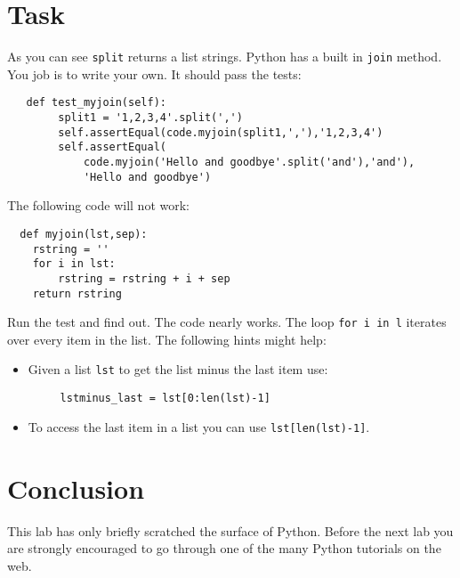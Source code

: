 \documentclass{paper}
\begin{document}
\section{Task}
As you can see {\tt split} returns a list strings. Python has a built
in {\tt join} method. You job is to write your own. It should pass the
tests:
\begin{lstlisting}
   def test_myjoin(self):
        split1 = '1,2,3,4'.split(',')
        self.assertEqual(code.myjoin(split1,','),'1,2,3,4')
        self.assertEqual(
            code.myjoin('Hello and goodbye'.split('and'),'and'),
            'Hello and goodbye')
\end{lstlisting}

The following code will not work:
\begin{lstlisting}
  def myjoin(lst,sep):
    rstring = '' 
    for i in lst:
        rstring = rstring + i + sep
    return rstring
\end{lstlisting}
Run the test and find out. The code nearly works. The loop {\tt for i
  in l} iterates over every item in the list. The following hints might help:
\begin{itemize}
\item Given a list {\tt lst} to get the list minus the last item use:
  \begin{lstlisting}
     lstminus_last = lst[0:len(lst)-1]
  \end{lstlisting}
\item To access the last item in a list you can use {\tt lst[len(lst)-1]}.
\end{itemize}


\section*{Conclusion}
This lab has only briefly scratched the surface of Python. Before the
next lab you are strongly encouraged to go through one of  the many
Python tutorials on the web. 
\end{document}
